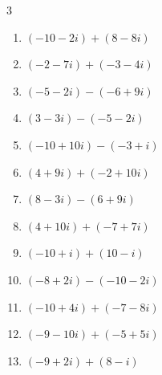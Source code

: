 \begin{multicols}{3}
\begin{enumerate}
        \phantom{$\displaystyle =-6$}

  \item $\displaystyle (-10-2i) + (8-8i)$

        \phantom{$\displaystyle =-2-10i$}

  \item $\displaystyle (-2-7i) + (-3-4i)$

        \phantom{$\displaystyle =-5-11i$}

  \item $\displaystyle (-5-2i) - (-6+9i)$

        \phantom{$\displaystyle =1-11i$}

  \item $\displaystyle (3-3i) - (-5-2i)$

        \phantom{$\displaystyle =8-i$}

  \item $\displaystyle (-10+10i) - (-3+i)$

        \phantom{$\displaystyle =-7+9i$}

\columnbreak %

  \item $\displaystyle (4+9i) + (-2+10i)$

        \phantom{$\displaystyle =2+19i$}

  \item $\displaystyle (8-3i) - (6+9i)$

        \phantom{$\displaystyle =2-12i$}

  \item $\displaystyle (4+10i) + (-7+7i)$

        \phantom{$\displaystyle =-3+17i$}

  \item $\displaystyle (-10+i) + (10-i)$

        \phantom{$\displaystyle =0$}

  \item $\displaystyle (-8+2i) - (-10-2i)$

        \phantom{$\displaystyle =2+4i$}

  \item $\displaystyle (-10+4i) + (-7-8i)$

        \phantom{$\displaystyle =-17-4i$}

  \item $\displaystyle (-9-10i) + (-5+5i)$

        \phantom{$\displaystyle =-14-5i$}

  \item $\displaystyle (-9+2i) + (8-i)$


\end{enumerate}
\end{multicols}

